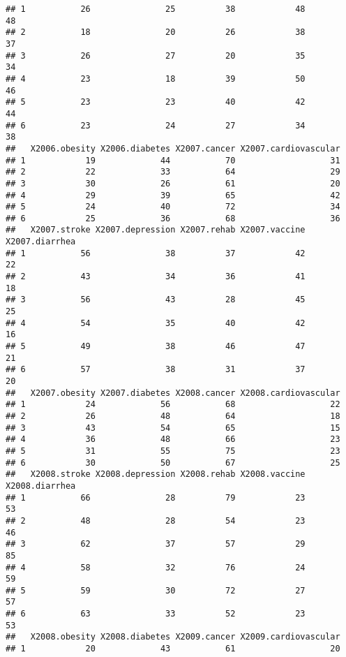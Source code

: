 \documentclass[]{article}
\begin{document}
\begin{verbatim}
## 1           26               25          38            48             48
## 2           18               20          26            38             37
## 3           26               27          20            35             34
## 4           23               18          39            50             46
## 5           23               23          40            42             44
## 6           23               24          27            34             38
##   X2006.obesity X2006.diabetes X2007.cancer X2007.cardiovascular
## 1            19             44           70                   31
## 2            22             33           64                   29
## 3            30             26           61                   20
## 4            29             39           65                   42
## 5            24             40           72                   34
## 6            25             36           68                   36
##   X2007.stroke X2007.depression X2007.rehab X2007.vaccine X2007.diarrhea
## 1           56               38          37            42             22
## 2           43               34          36            41             18
## 3           56               43          28            45             25
## 4           54               35          40            42             16
## 5           49               38          46            47             21
## 6           57               38          31            37             20
##   X2007.obesity X2007.diabetes X2008.cancer X2008.cardiovascular
## 1            24             56           68                   22
## 2            26             48           64                   18
## 3            43             54           65                   15
## 4            36             48           66                   23
## 5            31             55           75                   23
## 6            30             50           67                   25
##   X2008.stroke X2008.depression X2008.rehab X2008.vaccine X2008.diarrhea
## 1           66               28          79            23             53
## 2           48               28          54            23             46
## 3           62               37          57            29             85
## 4           58               32          76            24             59
## 5           59               30          72            27             57
## 6           63               33          52            23             53
##   X2008.obesity X2008.diabetes X2009.cancer X2009.cardiovascular
## 1            20             43           61                   20

\end{verbatim}
\end{document}
